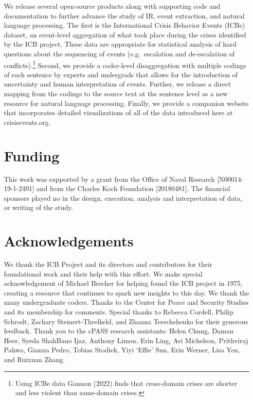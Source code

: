 \documentclass{article}
\begin{document}
We release several open-source products along with supporting code and
documentation to further advance the study of IR, event extraction, and
natural language processing. The first is the International Crisis
Behavior Events (ICBe) dataset, an event-level aggregation of what took
place during the crises identified by the ICB project. These data are
appropriate for statistical analysis of hard questions about the
sequencing of events (e.g.~escalation and de-escalation of
conflicts).\footnote{Using ICBe data Gannon (2022) finds that
  cross-domain crises are shorter and less violent than same-domain
  crises.} Second, we provide a coder-level disaggregation with multiple
codings of each sentence by experts and undergrads that allows for the
introduction of uncertainty and human interpretation of events. Further,
we release a direct mapping from the codings to the source text at the
sentence level as a new resource for natural language processing.
Finally, we provide a companion website that incorporates detailed
visualizations of all of the data introduced here at crisisevents.org.

\hypertarget{funding}{%
\section{Funding}\label{funding}}

This work was supported by a grant from the Office of Naval Research
{[}N00014-19-1-2491{]} and from the Charles Koch Foundation
{[}20180481{]}. The financial sponsors played no in the design,
execution, analysis and interpretation of data, or writing of the study.

\hypertarget{acknowledgements}{%
\section{Acknowledgements}\label{acknowledgements}}

We thank the ICB Project and its directors and contributors for their
foundational work and their help with this effort. We make special
acknowledgement of Michael Brecher for helping found the ICB project in
1975, creating a resource that continues to spark new insights to this
day. We thank the many undergraduate coders. Thanks to the Center for
Peace and Security Studies and its membership for comments. Special
thanks to Rebecca Cordell, Philip Schrodt, Zachary Steinert-Threlkeld,
and Zhanna Terechshenko for their generous feedback. Thank you to the
cPASS research assistants: Helen Chung, Daman Heer, Syeda ShahBano Ijaz,
Anthony Limon, Erin Ling, Ari Michelson, Prithviraj Pahwa, Gianna Pedro,
Tobias Stodiek, Yiyi `Effie' Sun, Erin Werner, Lisa Yen, and Ruixuan
Zhang.
\end{document}

